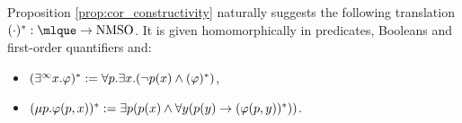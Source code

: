 %

Proposition \ref{prop:cor_constructivity} naturally suggests the following translation $\mgFOETr{\cdot}:\mlque\to\nmso$. It is given homomorphically in predicates, Booleans and first-order quantifiers and:
\begin{itemize}
 pt
\item $( \exists^\infty x. \varphi)^* := \forall p.\exists x. (\lnot p(x) \land (\varphi)^*)$,
\item $(\mu p. \varphi(p,x))^* := \exists p ( p(x) \land \forall y ( p(y) \to (\varphi(p,y) )^*))$.
\end{itemize}



